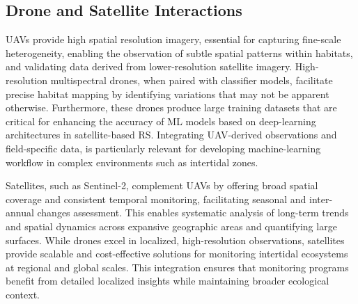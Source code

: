 \documentclass[
  letterpaper,
  11pt,
  english,
  singlespacing,
  headsepline]{MastersDoctoralThesis}
\begin{document}
\begin{spacing}{1.5}
\section{Drone and Satellite
Interactions}\label{drone-and-satellite-interactions}

UAVs provide high spatial resolution imagery, essential for capturing
fine-scale heterogeneity, enabling the observation of subtle spatial
patterns within habitats, and validating data derived from
lower-resolution satellite imagery. High-resolution multispectral
drones, when paired with classifier models, facilitate precise habitat
mapping by identifying variations that may not be apparent otherwise.
Furthermore, these drones produce large training datasets that are
critical for enhancing the accuracy of ML models based on deep-learning
architectures in satellite-based RS. Integrating UAV-derived
observations and field-specific data, is particularly relevant for
developing machine-learning workflow in complex environments such as
intertidal zones.

Satellites, such as Sentinel-2, complement UAVs by offering broad
spatial coverage and consistent temporal monitoring, facilitating
seasonal and inter-annual changes assessment. This enables systematic
analysis of long-term trends and spatial dynamics across expansive
geographic areas and quantifying large surfaces. While drones excel in
localized, high-resolution observations, satellites provide scalable and
cost-effective solutions for monitoring intertidal ecosystems at
regional and global scales. This integration ensures that monitoring
programs benefit from detailed localized insights while maintaining
broader ecological context.

\begin{figure}

\end{figure}
\end{spacing}
\end{document}
